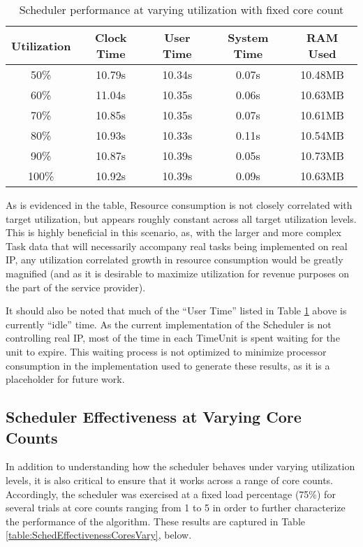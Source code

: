 \begin{table}[ht!]
    \centering\begin{tabular}{| c | c | c | c | c |}
        \hline
        Utilization & Clock Time & User Time & System Time & RAM Used \\
        \hline
        50\% & 10.79s & 10.34s & 0.07s & 10.48MB \\
        60\% & 11.04s & 10.35s & 0.06s & 10.63MB \\
        70\% & 10.85s & 10.35s & 0.07s & 10.61MB \\
        80\% & 10.93s & 10.33s & 0.11s & 10.54MB \\
        90\% & 10.87s & 10.39s & 0.05s & 10.73MB \\
        100\% & 10.92s & 10.39s & 0.09s & 10.63MB \\
        \hline
    \end{tabular}
    \caption{Scheduler performance at varying utilization with fixed core count}
    \label{table:SchedPerfUtilVary}
\end{table}

As is evidenced in the table, Resource consumption is not closely correlated with target utilization, but appears roughly constant across all target utilization levels. This is highly beneficial in this scenario, as, with the larger and more complex Task data that will necessarily accompany real tasks being implemented on real IP, any utilization correlated growth in resource consumption would be greatly magnified (and as it is desirable to maximize utilization for revenue purposes on the part of the service provider). 

It should also be noted that much of the ``User Time'' listed in Table \ref{table:SchedPerfUtilVary} above is currently ``idle'' time. As the current implementation of the Scheduler is not controlling real IP, most of the time in each TimeUnit is spent waiting for the unit to expire. This waiting process is not optimized to minimize processor consumption in the implementation used to generate these results, as it is a placeholder for future work.

\subsection{Scheduler Effectiveness at Varying Core Counts}\label{subsec:SchedulerDataCoresVary}
In addition to understanding how the scheduler behaves under varying utilization levels, it is also critical to ensure that it works across a range of core counts. Accordingly, the scheduler was exercised at a fixed load percentage (75\%) for several trials at core counts ranging from 1 to 5 in order to further characterize the performance of the algorithm. These results are captured in Table \ref{table:SchedEffectivenessCoresVary}, below.

